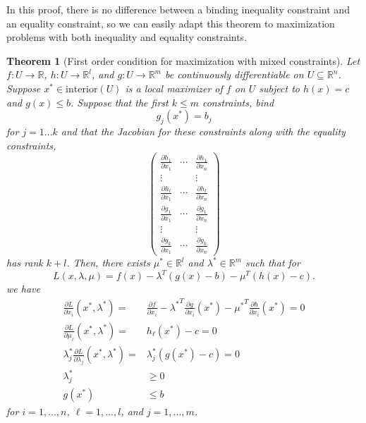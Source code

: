 \documentclass[12pt,reqno]{amsart}
\newtheorem{theorem}{Theorem}[section]
\theoremstyle{definition}
\def\R{\mathbb{R}}
\renewcommand{\to}{{\rightarrow}}
\begin{document}
In this proof, there is no difference between a binding
inequality constraint and an equality constraint, so we can easily
adapt this theorem to maximization problems with both inequality and
equality constraints.

\begin{theorem}[First order condition for maximization with mixed constraints] \label{thm:mcon}
  Let $f:U \to \R$, $h:U \to \R^l$, and $g: U \to \R^m$ be
  continuously differentiable on $U \subseteq \R^n$. Suppose $x^* \in 
  \mathrm{interior}(U)$ is a local maximizer of $f$ on $U$ subject to 
  $h(x) = c$ and $g(x) \leq b$. Suppose that the first $k \leq m$
  constraints, bind 
  \[ g_j(x^*) = b_j \]
  for $j = 1 ... k$ and that the Jacobian for these constraints along
  with the equality constraints,
  \[ \begin{pmatrix} 
    \frac{\partial h_1}{\partial x_1} &  \cdots &\frac{\partial
      h_1}{\partial x_n}  \\
    \vdots & & \vdots \\
    \frac{\partial h_l}{\partial x_1} &  \cdots &\frac{\partial
      h_l}{\partial x_n}  \\    
    \frac{\partial g_1}{\partial x_1} &  \cdots &\frac{\partial g_1}{\partial x_n}  \\
    \vdots & & \vdots \\
    \frac{\partial g_k}{\partial x_1} &  \cdots &\frac{\partial
      g_k}{\partial x_n}  
  \end{pmatrix}
  \]
  has rank $k+l$. Then, there exists
  $\mu^* \in \R^l$ and $\lambda^* \in \R^m$ such that for 
  \[ L(x,\lambda,\mu) = f(x) - \lambda^T (g(x) - b) - \mu^T(h(x) - c). \]
  we have
  \begin{align*}
    \frac{\partial L}{\partial x_i}(x^*,\lambda^*) = & \frac{\partial
      f}{\partial x_i} - {\lambda^*}^T \frac{\partial g}{\partial
      x_i}(x^*) - {\mu^*}^T \frac{\partial h}{\partial x_i}(x^*)= 0 \\
    \frac{\partial L}{\partial \mu_\ell}(x^*,\lambda^*) = & h_\ell(x^*) - c = 0 \\
    \lambda_j^* \frac{\partial L}{\partial \lambda_j}(x^*,\lambda^*) =
    & \lambda_j^* \left(g(x^*) - c \right)= 0 \\
    \lambda_j^* & \geq 0 \\
    g(x^*) & \leq b
  \end{align*}
  for $i = 1, ..., n$, $\ell = 1,..., l$, and $j=1,...,m$.
\end{theorem}
\end{document}
